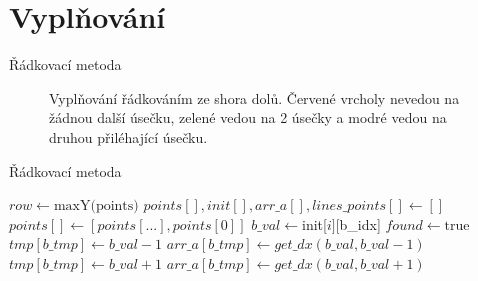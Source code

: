 \documentclass[a4paper,12pt]{book}
\begin{document}
\section{Vyplňování} %


Řádkovací metoda


\begin{figure}[H]
  \centering
  
  \caption{Vyplňování řádkováním ze shora dolů. Červené vrcholy nevedou na žádnou další úsečku, zelené vedou na 2 úsečky a modré vedou na druhou přiléhající úsečku.}
\end{figure}



\begin{algorithm}
\caption{Řádkovací metoda}
\begin{algorithmic}


\State $row \gets \text{maxY(points)}$
\State $points[], init[],arr\_a[],lines\_points[] \gets []$
\State $points[] \gets [points[...],points[0]]$
   \State $b\_val \gets $init[$i][$b\_idx]
	 \State $found \gets \text{true}$
	  	\State $tmp[b\_tmp] \gets b\_val-1$
	  	\State $arr\_a[b\_tmp] \gets get\_dx(b\_val,b\_val-1)$
	  	\State $tmp[b\_tmp] \gets b\_val+1$
	  	\State $arr\_a[b\_tmp] \gets get\_dx(b\_val,b\_val+1)$
		\State {}
	\Else
		\State {}
		\State {}
	  \EndIf
		 \State {}
	\EndIf
\EndFor
{}
		\\
	

\end{algorithmic}
\end{algorithm}
\end{document}
